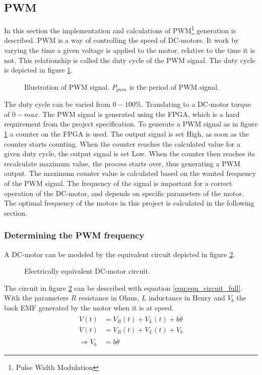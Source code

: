 \documentclass[../../../Main]{subfiles}
\begin{document}
\subsection{PWM}
In this section the implementation and calculations of PWM\footnote{Pulse Width Modulation} generation is described. PWM is a way of controlling the speed of DC-motors. It work by varying the time a given voltage is applied to the motor, relative to the time it is not. This relationship is called the duty cycle of the PWM signal. The duty cycle is depicted in figure \ref{fig:pwm}.

\begin{figure}[h]
  
  \caption{Illustration of PWM signal. $P_{pwm}$ is the period of PWM signal.}
  \label{fig:pwm}
\end{figure}

The duty cycle can be varied from $0 - 100\%$. Translating to a DC-motor torque of $0 - max$.
The PWM signal is generated using the FPGA, which is a hard requirement from the project  specification. To generate a PWM signal as in figure \ref{fig:pwm} a counter on the FPGA  is used.
The output signal is set High, as soon as the counter starts counting. When the counter reaches the calculated value for a given duty cycle, the output signal is set Low. When the counter then reaches its recalculate maximum value, the process starts over, thus generating a PWM output. The maximum counter value is calculated based on the wanted frequency of the PWM signal. The frequency of the signal is important for a correct operation of the DC-motor, and depends on specific parameters of the motor. The optimal frequency of the motors in this project is calculated in the following section.
\newpage
\subsubsection{Determining the PWM frequency}

A DC-motor can be modeled by the equivalent circuit depicted in figure \ref{fig:electrical_equ}.

\begin{figure}[ht]
	\center
    \def\svgwidth{0.5\textwidth}
	
	\caption{Electrically equivalent DC-motor circuit.}
  \label{fig:electrical_equ}
\end{figure}
The circuit in figure \ref{fig:electrical_equ} can be described with equation \eqref{equ:equ_circuit_full}. With the parameters $R$ resistance in Ohms, $L$ inductance in Henry and $V_b$ the back EMF generated by the motor when it is at speed.
\begin{align}
	V(t) &= V_R(t) + V_L(t) + b\dot{\theta}\\
 \label{equ:equ_circuit_full}
	V(t) &= V_R(t) + V_L(t) + V_b\\
	\Rightarrow V_b &= b\dot{\theta}
\end{align}
\end{document}
